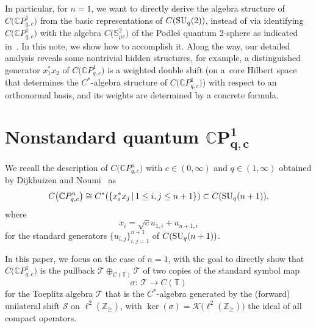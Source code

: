In particular, for $n=1$, we want to directly derive the algebra structure of
$C\big( \mathbb{C}P_{q,c}^{1}\big) $ from the basic representations of
$C( {\rm SU}_{q}(2)) $, instead of via identifying
$C\big( \mathbb{C}P_{q,c}^{1}\big) $ with the algebra $C\big(\mathbb{S}_{\mu c}^{2}\big) $ of the Podle\'{s} quantum 2-sphere \cite{Po}
as indicated in~\cite{DiNo, KoVa}. In this note, we show how to accomplish it.
Along the way, our detailed analysis reveals some nontrivial hidden
structures, for example, a distinguished generator $x_{1}^{\ast}x_{2}$ of
$C\big( \mathbb{C}P_{q,c}^{1}\big) $ is a weighted double shift (on a~core Hilbert space that determines the $C^*$-algebra structure of $C\big(\mathbb{C}P_{q,c}^{1}\big) $) with respect to an orthonormal basis, and its weights are determined by a concrete formula.

\section[Nonstandard quantum $\mathbb{C}P_{q,c}^{1}$]{Nonstandard quantum $\boldsymbol{\mathbb{C}P_{q,c}^{1}}$}

We recall the description of $C\big( \mathbb{C}P_{q,c}^{n}\big) $ with
$c\in ( 0,\infty ) $ and $q\in ( 1,\infty ) $ obtained
by Dijkhuizen and Noumi~\cite{DiNo} as
\[
C\big(\mathbb{C}P_{q,c}^{n}\big)\cong C^{\ast}(\{x_{i}^{\ast}x_{j}\,|\,1\leq i,j\leq
n+1\})\subset C ( {\rm SU}_{q}(n+1) ),
\]
where
\[
x_{i}=\sqrt{c}u_{1,i}+u_{n+1,i}
\]
for the standard generators $\{ u_{i,j}\} _{i,j=1}^{n+1}$ of $C( {\rm SU}_{q}(n+1))$.

In this paper, we focus on the case of $n=1$, with the goal to directly show
that $C\big( \mathbb{C}P_{q,c}^{1}\big) $ is the pullback $\mathcal{T}\oplus_{C( \mathbb{T}) }\mathcal{T}$ of two copies of the
standard symbol map
\[
\sigma\colon \ \mathcal{T}\rightarrow C ( \mathbb{T} )
\]
for the Toeplitz algebra $\mathcal{T}$ that is the $C^*$-algebra generated by the
(forward) unilateral shift $\mathcal{S}$ on $\ell^{2}( \mathbb{Z}_{\geq
}) $, with $\ker( \sigma) =\mathcal{K}\big( \ell
^{2} ( \mathbb{Z}_{\geq} )\big) $ the ideal of all compact operators.

